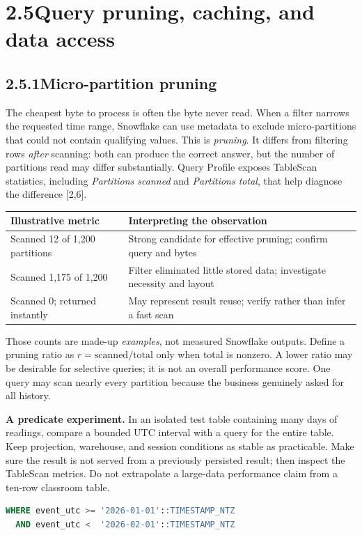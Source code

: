 \documentclass[11pt,twoside]{article}
\newcommand{\topic}[2]{\subsection*{#1\quad #2}}
\begin{document}
\newpage
\section*{2.5\quad Query pruning, caching, and data access}
\topic{2.5.1}{Micro-partition pruning}
The cheapest byte to process is often the byte never read. When a filter narrows the requested time range, Snowflake can use metadata to exclude micro-partitions that could not contain qualifying values. This is \emph{pruning}. It differs from filtering rows \emph{after} scanning: both can produce the correct answer, but the number of partitions read may differ substantially. Query Profile exposes TableScan statistics, including \emph{Partitions scanned} and \emph{Partitions total}, that help diagnose the difference [2,6].

\begin{center}\small
\begin{tabularx}{\linewidth}{@{}p{45mm}X@{}}\toprule
\textbf{Illustrative metric} & \textbf{Interpreting the observation}\\\midrule
Scanned 12 of 1,200 partitions & Strong candidate for effective pruning; confirm query and bytes\\
Scanned 1,175 of 1,200 & Filter eliminated little stored data; investigate necessity and layout\\
Scanned 0; returned instantly & May represent result reuse; verify rather than infer a fast scan\\
\bottomrule\end{tabularx}\end{center}

Those counts are made-up \emph{examples}, not measured Snowflake outputs. Define a pruning ratio as \(r=\text{scanned}/\text{total}\) only when total is nonzero. A lower ratio may be desirable for selective queries; it is not an overall performance score. One query may scan nearly every partition because the business genuinely asked for all history.

\textbf{A predicate experiment.} In an isolated test table containing many days of readings, compare a bounded UTC interval with a query for the entire table. Keep projection, warehouse, and session conditions as stable as practicable. Make sure the result is not served from a previously persisted result; then inspect the TableScan metrics. Do not extrapolate a large-data performance claim from a ten-row classroom table.

\begin{lstlisting}[language=SQL,caption={An explicit half-open UTC interval predicate.}]
WHERE event_utc >= '2026-01-01'::TIMESTAMP_NTZ
  AND event_utc <  '2026-02-01'::TIMESTAMP_NTZ
\end{lstlisting}
\end{document}
